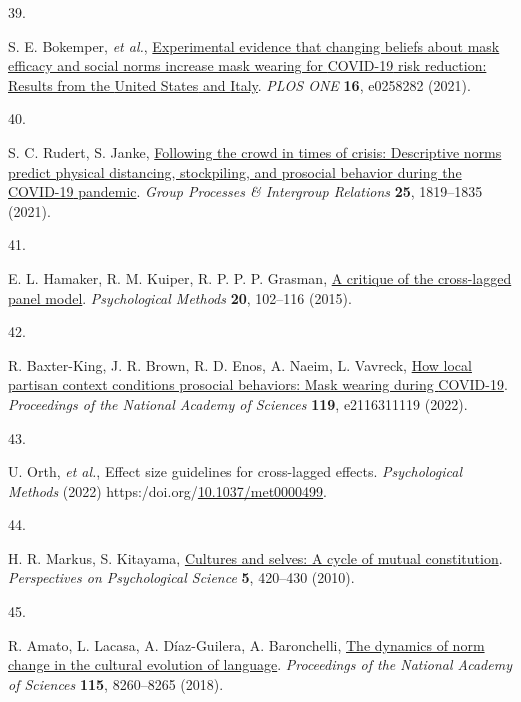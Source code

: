 \documentclass[
  man, donotrepeattitle,floatsintext]{apa6}
\newlength{\cslhangindent}
\newlength{\csllabelwidth}
\newlength{\cslentryspacingunit} %
\newenvironment{CSLReferences}[2] %
 {%
  \setlength{\parindent}{0pt}
  \ifodd #1
  \let\oldpar\par
  \def\par{\hangindent=\cslhangindent\oldpar}
  \fi
  \setlength{\parskip}{#2\cslentryspacingunit}
 }%
 {}
\newcommand{\CSLLeftMargin}[1]{\parbox[t]{\csllabelwidth}{#1}}
\newcommand{\CSLRightInline}[1]{\parbox[t]{\linewidth - \csllabelwidth}{#1}\break}
\begin{document}
\begin{CSLReferences}{0}{0}
\leavevmode{}%
\CSLLeftMargin{39. }%
\CSLRightInline{S. E. Bokemper, \emph{et al.}, \href{https://doi.org/10.1371/journal.pone.0258282}{Experimental evidence that changing beliefs about mask efficacy and social norms increase mask wearing for {COVID-19} risk reduction: Results from the {United States} and {Italy}}. \emph{PLOS ONE} \textbf{16}, e0258282 (2021).}

\leavevmode{}%
\CSLLeftMargin{40. }%
\CSLRightInline{S. C. Rudert, S. Janke, \href{https://doi.org/10.1177/13684302211023562}{Following the crowd in times of crisis: Descriptive norms predict physical distancing, stockpiling, and prosocial behavior during the {COVID-19} pandemic}. \emph{Group Processes \& Intergroup Relations} \textbf{25}, 1819--1835 (2021).}

\leavevmode{}%
\CSLLeftMargin{41. }%
\CSLRightInline{E. L. Hamaker, R. M. Kuiper, R. P. P. P. Grasman, \href{https://doi.org/10.1037/a0038889}{A critique of the cross-lagged panel model}. \emph{Psychological Methods} \textbf{20}, 102--116 (2015).}

\leavevmode{}%
\CSLLeftMargin{42. }%
\CSLRightInline{R. Baxter-King, J. R. Brown, R. D. Enos, A. Naeim, L. Vavreck, \href{https://doi.org/10.1073/pnas.2116311119}{How local partisan context conditions prosocial behaviors: Mask wearing during {COVID-19}}. \emph{Proceedings of the National Academy of Sciences} \textbf{119}, e2116311119 (2022).}

\leavevmode{}%
\CSLLeftMargin{43. }%
\CSLRightInline{U. Orth, \emph{et al.}, Effect size guidelines for cross-lagged effects. \emph{Psychological Methods} (2022) https:/doi.org/\href{https://doi.org/10.1037/met0000499}{10.1037/met0000499}.}

\leavevmode{}%
\CSLLeftMargin{44. }%
\CSLRightInline{H. R. Markus, S. Kitayama, \href{https://doi.org/10.1177/1745691610375557}{Cultures and selves: A cycle of mutual constitution}. \emph{Perspectives on Psychological Science} \textbf{5}, 420--430 (2010).}

\leavevmode{}%
\CSLLeftMargin{45. }%
\CSLRightInline{R. Amato, L. Lacasa, A. Díaz-Guilera, A. Baronchelli, \href{https://doi.org/10.1073/pnas.1721059115}{The dynamics of norm change in the cultural evolution of language}. \emph{Proceedings of the National Academy of Sciences} \textbf{115}, 8260--8265 (2018).}


\end{CSLReferences}
\end{document}
